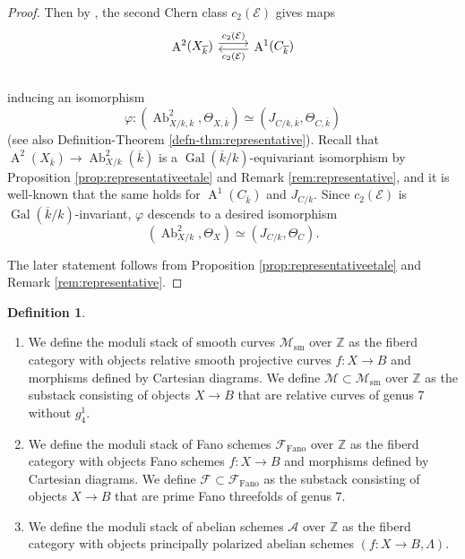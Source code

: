 \documentclass[autodetect-engine, a4paper]{amsart}
\theoremstyle{definition}
\newtheorem{defn}[thm]{Definition}
\def\Z{{\mathbb Z}}
\DeclareMathOperator\A{\mathrm{A}}
\DeclareMathOperator\Ab{\mathrm{Ab}}
\DeclareMathOperator\Gal{\mathrm{Gal}}
\begin{document}
\begin{proof}
Then by \cite[Proposition 8.4]{KuznetsovProkhorov}, the second Chern class $c_2 (\mathcal{E})$ gives maps
\[
\begin{tikzcd}
\A^2(X_{\overline{k}}) \arrow[r,yshift=0.6ex, "c_2(\mathcal{E})"] & \A^1(C_{\overline{k}}) \arrow[l,yshift=-0.5ex,"c_2(\mathcal{E})"]\\
\end{tikzcd}
\]
inducing an isomorphism 
\[
\varphi \colon (\Ab^2_{X/k, \overline{k}}, \Theta_{X, \overline{k}}) \simeq (J_{C/k, \overline{k}}, \Theta_{C, \overline{k}})
\]
(see also Definition-Theorem \ref{defn-thm:representative}).
Recall that $\A^2 (X_{\overline{k}}) \rightarrow \Ab^{2}_{X/k} (\overline{k})$ is a $\Gal(\overline{k}/k)$-equivariant isomorphism by Proposition \ref{prop:representativeetale} 
and Remark \ref{rem:representative}, 
and it is well-known that the same holds for $\A^1(C_{\overline{k}})$ and $J_{C/k}$.
Since $c_{2} (\mathcal{E})$ is $\Gal(\overline{k}/k)$-invariant, $\varphi$ descends to a desired isomorphism
\[
(\Ab_{X/k}^2, \Theta_{X}) \simeq (J_{C/k},\Theta_{C}).
\]

The later statement follows from Proposition \ref{prop:representativeetale} and Remark \ref{rem:representative}.
\end{proof}


\begin{defn}
\begin{enumerate}
\item 
We define the moduli stack of smooth curves $\mathcal{M}_{\mathrm{sm}}$ over $\Z$ as the fiberd category with objects relative smooth projective curves $f \colon X \rightarrow B$ and morphisms defined by Cartesian diagrams.
We define $\mathcal{M} \subset \mathcal{M}_{\mathrm{sm}}$ over $\Z$ as the substack consisting of objects $X \rightarrow B$ that are relative curves of genus 7 without $g_4^1$. 
\item 
We define the moduli stack of Fano schemes $\mathcal{F}_{\mathrm{Fano}}$ over $\Z$ as the fiberd category with objects Fano schemes $f \colon X \rightarrow B$ and morphisms defined by Cartesian diagrams.
We define $\mathcal{F} \subset \mathcal{F}_{\mathrm{Fano}}$ as the substack consisting of objects $X \rightarrow B$ that are prime Fano threefolds of genus $7$.
\item 
We define the moduli stack of abelian schemes $\mathcal{A}$ over $\Z$ as the fiberd category with objects principally polarized abelian schemes $(f \colon X \rightarrow B, \Lambda)$.
\end{enumerate}
\end{defn}
\end{document}
